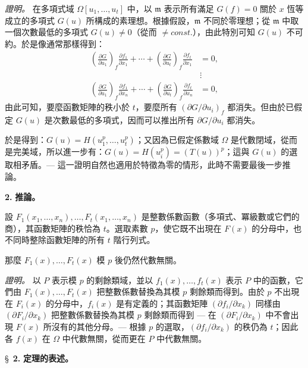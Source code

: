 \documentclass[11pt]{article}
\begin{document}
\noindent\textit{證明。}
在多項式域 $\Omega[u_1,\ldots,u_t]$ 中，以 $\mathfrak{m}$ 表示所有滿足 $G(f) = 0$ 關於 $x$ 恆等成立的多項式 $G(u)$ 所構成的素理想。根據假設，$\mathfrak{m}$ 不同於零理想；從 $\mathfrak{m}$ 中取一個次數最低的多項式 $G(u) \neq 0$（從而 $\neq {const.}$），由此特別可知 $G(u)$ 不可約。於是像通常那樣得到：
\[
\begin{aligned}
\left(\frac{\partial G}{\partial u_1}\right)_{f}\frac{\partial f_1}{\partial x_1}
 +\cdots+
\left(\frac{\partial G}{\partial u_t}\right)_{f}\frac{\partial f_t}{\partial x_1}&=0,\\[-1mm]
&\vdots\\[-1mm]
\left(\frac{\partial G}{\partial u_1}\right)_{f}\frac{\partial f_1}{\partial x_n}
 +\cdots+
\left(\frac{\partial G}{\partial u_t}\right)_{f}\frac{\partial f_t}{\partial x_n}&=0,
\end{aligned}
\]
由此可知，要麼函數矩陣的秩小於 $t$，要麼所有 $\left(\partial G/\partial u_i\right)_{f}$ 都消失。但由於已假定 $G(u)$ 是次數最低的多項式，因而可以推出所有 $\partial G/\partial u_i$ 都消失。

於是得到：$G(u)=H(u_1^p,\ldots,u_t^p)$；又因為已假定係數域 $\Omega$ 是代數閉域，從而是完美域，所以進一步有：$G(u)=H(u_i^p)=(T(u))^p$；這與 $G(u)$ 的選取相矛盾。--- 這一證明自然也適用於特徵為零的情形，此時不需要最後一步推論。

\medskip\noindent\textbf{2.} \textbf{推論。}

設 $F_1(x_1,\ldots,x_n),\ldots,F_t(x_1,\ldots,x_n)$ 是整數係數函數（多項式、冪級數或它們的商），其函數矩陣的秩恰為 $t$。選取素數 $p$，使它既不出現在 $F(x)$ 的分母中，也不同時整除函數矩陣的所有 $t$ 階行列式。

那麼 $F_1(x),\ldots,F_t(x)$ 模 $p$ 後仍然代數無關。

\noindent\textit{證明。}
以 $P$ 表示模 $p$ 的剩餘類域，並以 $f_1(x),\ldots,f_t(x)$ 表示 $P$ 中的函數，它們由 $F_1(x),\ldots,F_t(x)$ 把整數係數替換為其模 $p$ 剩餘類而得到。由於 $p$ 不出現在 $F_i(x)$ 的分母中，$f_i(x)$ 是有定義的；其函數矩陣 $(\partial f_i/\partial x_k)$ 同樣由 $(\partial F_i/\partial x_k)$ 把整數係數替換為其模 $p$ 剩餘類而得到 --- 在 $(\partial F_i/\partial x_k)$ 中不會出現 $F(x)$ 所沒有的其他分母。--- 根據 $p$ 的選取，$(\partial f_i/\partial x_k)$ 的秩仍為 $t$；因此各 $f(x)$ 在 $\Omega$ 中代數無關，從而更在 $P$ 中代數無關。

\bigskip
\S~\textbf{2.}
\textbf{定理的表述。}

\smallskip
\end{document}
